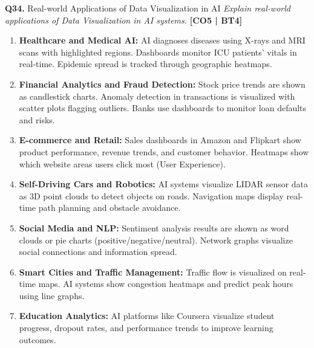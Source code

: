\documentclass[12pt,a4paper]{article}
\newcommand{\Qno}[1]{\textbf{\color{darkred}Q#1.}}
\newcommand{\term}[1]{\textbf{\color{headingcolor}#1}}
\begin{document}
\vspace{8pt}

\begin{questionbox}{\Qno{34} Real-world Applications of Data Visualization in AI}
\textit{Explain real-world applications of Data Visualization in AI systems.} \hfill \textbf{[CO5 | BT4]}
\end{questionbox}

\begin{answerenv}

\begin{enumerate}[leftmargin=1.8em, itemsep=6pt]
  \item \term{Healthcare and Medical AI:}
  AI diagnoses diseases using X-rays and MRI scans with highlighted regions. Dashboards monitor ICU patients' vitals in real-time. Epidemic spread is tracked through geographic heatmaps.

  \item \term{Financial Analytics and Fraud Detection:}
  Stock price trends are shown as candlestick charts. Anomaly detection in transactions is visualized with scatter plots flagging outliers. Banks use dashboards to monitor loan defaults and risks.

  \item \term{E-commerce and Retail:}
  Sales dashboards in Amazon and Flipkart show product performance, revenue trends, and customer behavior. Heatmaps show which website areas users click most (User Experience).

  \item \term{Self-Driving Cars and Robotics:}
  AI systems visualize LIDAR sensor data as 3D point clouds to detect objects on roads. Navigation maps display real-time path planning and obstacle avoidance.

  \item \term{Social Media and NLP:}
  Sentiment analysis results are shown as word clouds or pie charts (positive/negative/neutral). Network graphs visualize social connections and information spread.

  \item \term{Smart Cities and Traffic Management:}
  Traffic flow is visualized on real-time maps. AI systems show congestion heatmaps and predict peak hours using line graphs.

  \item \term{Education Analytics:}
  AI platforms like Coursera visualize student progress, dropout rates, and performance trends to improve learning outcomes.
\end{enumerate}

\end{answerenv}
\end{document}
